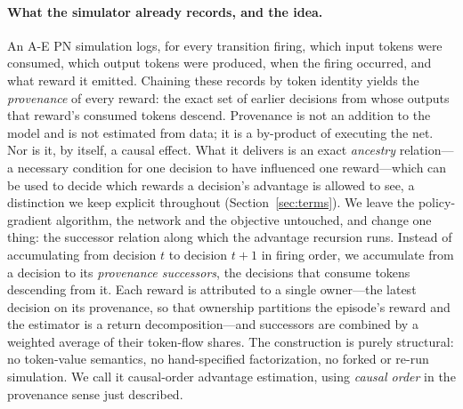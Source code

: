 \documentclass[review,authoryear,3p,times]{elsarticle}
\begin{document}
\paragraph{What the simulator already records, and the idea.}
An A-E PN simulation logs, for every transition firing, which input tokens were
consumed, which output tokens were produced, when the firing occurred, and what
reward it emitted. Chaining these records by token identity yields the
\emph{provenance} of every reward: the exact set of earlier decisions from whose
outputs that reward's consumed tokens descend. Provenance is not an addition to
the model and is not estimated from data; it is a by-product of executing the
net. Nor is it, by itself, a causal effect. What it delivers is an exact
\emph{ancestry} relation---a necessary condition for one decision to have
influenced one reward---which can be used to decide which rewards a decision's
advantage is allowed to see, a distinction we keep explicit throughout
(Section~\ref{sec:terms}). We leave the policy-gradient algorithm, the network
and the objective untouched, and change one thing: the successor relation along
which the advantage recursion runs. Instead of accumulating from decision $t$ to
decision $t+1$ in firing order, we accumulate from a decision to its
\emph{provenance successors}, the decisions that consume tokens descending from
it. Each reward is attributed to a single owner---the latest decision on its
provenance, so that ownership partitions the episode's reward and the estimator
is a return decomposition---and successors are combined by a weighted average of
their token-flow shares. The construction is purely structural: no token-value
semantics, no hand-specified factorization, no forked or re-run simulation. We
call it causal-order advantage estimation, using \emph{causal order} in the
provenance sense just described.
\end{document}
